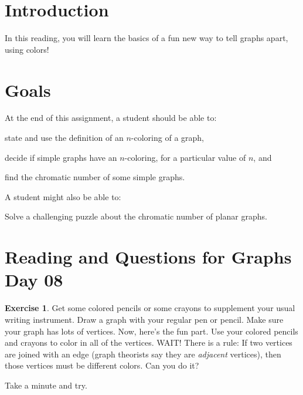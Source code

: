 \documentclass[12pt,letterpaper]{article}
\theoremstyle{definition}
\newtheorem{exercise}[question]{Exercise}
\begin{document}
\setlength{\parskip}{1ex plus 0.5ex minus 0.2ex}
\setlength{\parindent}{0pt}

\pagestyle{fancy}
\cfoot{}

\section*{Introduction}

In this reading, you will learn the basics of a fun new way to tell graphs apart, using colors!

\section*{Goals}
At the end of this assignment, a student should be able to:
\begin{compactitem}
\item state and use the definition of an $n$-coloring of a graph,
\item decide if simple graphs have an $n$-coloring, for a particular value of $n$, and
\item find the chromatic number of some simple graphs.
\end{compactitem}
A student might also be able to:
\begin{compactitem}
\item Solve a challenging puzzle about the chromatic number of planar graphs.
\end{compactitem}

\section*{Reading and Questions for Graphs Day 08}

\begin{exercise}
Get some colored pencils or some crayons to supplement your usual writing instrument. Draw a graph with
your regular pen or pencil. Make sure your graph has lots of vertices. Now, here's the fun part. Use your colored
pencils and crayons to color in all of the vertices. WAIT! There is a rule: If two vertices are joined with an edge
(graph theorists say they are \emph{adjacent} vertices), then those vertices must be different colors.
Can you do it? 

Take a minute and try.
\end{exercise}
\end{document}
